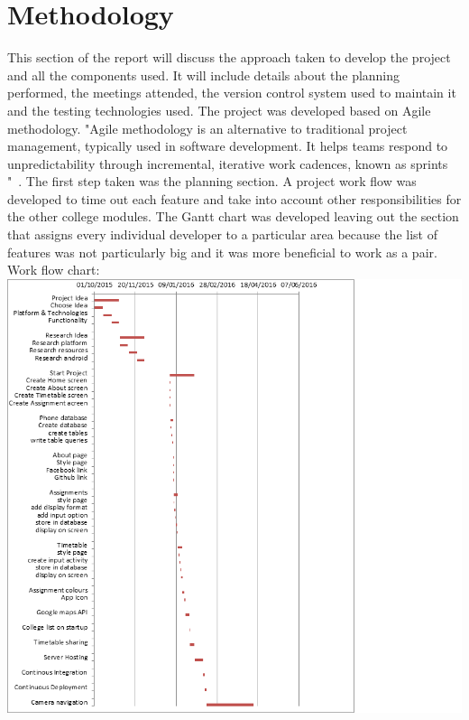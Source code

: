 \chapter{Methodology}
This section of the report will discuss the approach taken to develop the project and all the components used. It will include details about the planning performed, the meetings attended, the version control system used to maintain it and the testing technologies used.
The project was developed based on Agile methodology. "Agile methodology is an alternative to traditional project management, typically used in software development. It helps teams respond to unpredictability through incremental, iterative work cadences, known as sprints "~\cite{agile}. 
The first step taken was the planning section. A project work flow was developed to time out each feature and take into account other responsibilities for the other college modules. The Gantt chart was developed leaving out the section that assigns every individual developer to a particular area because the list of features was not particularly big and it was more beneficial to work as a pair.
Work flow chart: \includegraphics{img/gannt.png}

